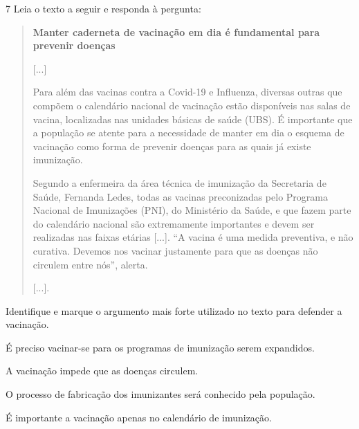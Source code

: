 
\num{7} Leia o texto a seguir e responda à pergunta:

\begin{quote}
\textbf{Manter caderneta de vacinação em dia é fundamental para prevenir
doenças}

{[}...{]}

Para além das vacinas contra a Covid-19 e Influenza, diversas outras que
compõem o calendário nacional de vacinação estão disponíveis nas salas
de vacina, localizadas nas unidades básicas de saúde (UBS). É importante
que a população se atente para a necessidade de manter em dia o esquema
de vacinação como forma de prevenir doenças para as quais já existe
imunização.

Segundo a enfermeira da área técnica de imunização da Secretaria de
Saúde, Fernanda Ledes, todas as vacinas preconizadas pelo Programa
Nacional de Imunizações (PNI), do Ministério da Saúde, e que fazem parte
do calendário nacional são extremamente importantes e devem ser
realizadas nas faixas etárias {[}...{]}. “A vacina é uma medida
preventiva, e não curativa. Devemos nos vacinar justamente para que as
doenças não circulem entre nós”, alerta.

{[}...{]}.

\end{quote}

Identifique e marque o argumento mais forte utilizado no texto para defender a
vacinação.

\begin{escolha}
\item É preciso vacinar-se para os programas de imunização serem expandidos.

\item A vacinação impede que as doenças circulem.

\item O processo de fabricação dos imunizantes será conhecido pela população.

\item É importante a vacinação apenas no calendário de imunização.
\end{escolha}

